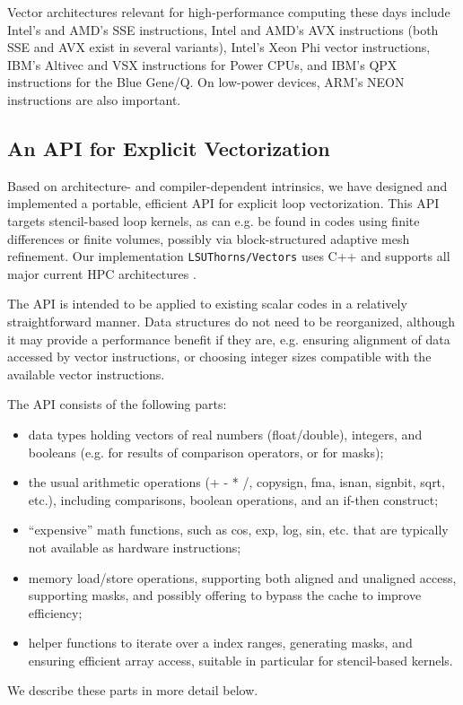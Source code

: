 \documentclass[conference]{IEEEtran}
\begin{document}
Vector architectures relevant for high-performance computing these
days include Intel's and AMD's SSE instructions, Intel and AMD's AVX
instructions (both SSE and AVX exist in several variants), Intel's Xeon
Phi vector instructions, IBM's Altivec and VSX instructions for Power
CPUs, and IBM's QPX instructions for the Blue Gene/Q. On low-power
devices, ARM's NEON instructions are also important.

\subsection{An API for Explicit Vectorization}

Based on architecture- and compiler-dependent intrinsics, we have
designed and implemented a portable, efficient API for explicit loop
vectorization. This API targets stencil-based loop kernels, as can
e.g. be found in codes using finite differences or finite volumes,
possibly via block-structured adaptive mesh refinement. Our
implementation \verb+LSUThorns/Vectors+ uses C++ and supports all
major current HPC architectures \cite{Loffler:2011ay,
  EinsteinToolkit:web}.

The API is intended to be applied to existing scalar codes in a
relatively straightforward manner. Data structures do not need to be
reorganized, although it may provide a performance benefit if they
are, e.g. ensuring alignment of data accessed by vector instructions,
or choosing integer sizes compatible with the available vector
instructions.

The API consists of the following parts:
\begin{itemize}
\item data types holding vectors of real numbers (float/double),
  integers, and booleans (e.g. for results of comparison operators, or
  for masks);
\item the usual arithmetic operations (+ - * /, copysign, fma, isnan,
  signbit, sqrt, etc.), including comparisons, boolean operations, and
  an if-then construct;
\item ``expensive'' math functions, such as cos, exp, log, sin, etc.
  that are typically not available as hardware instructions;
\item memory load/store operations, supporting both aligned and
  unaligned access, supporting masks, and possibly offering to bypass
  the cache to improve efficiency;
\item helper functions to iterate over a index ranges, generating
  masks, and ensuring efficient array access, suitable in particular
  for stencil-based kernels.
\end{itemize}
We describe these parts in more detail below.
\end{document}
